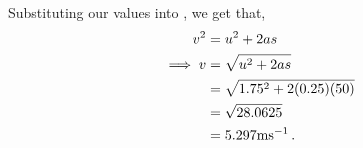 \begin{subquestions}
\begin{subsubquestions}
Substituting our values into , we get that,
\begin{align}
	v^2 & = u^2 + 2as \nonumber \\
	\implies v & = \sqrt{u^2+2as} \nonumber \\
	  & = \sqrt{1.75^2+2(0.25)(50)} \nonumber \\
	  & = \sqrt{28.0625} \nonumber \\
	  & =  5.297 \text{ms}^{-1} \,.
\end{align}

\end{subsubquestions}
	
\end{subquestions}